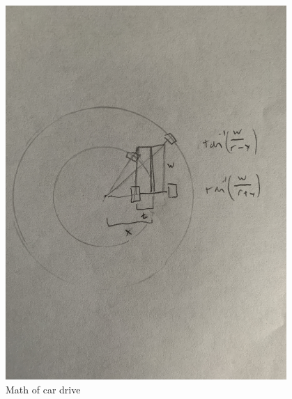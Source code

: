\begin{figure}[ht]
\begin{minipage}[b]{.48\textwidth}
  \includegraphics[width=0.95\textwidth]{Meetings/September/09-24-22/9-24-22_Hardware_Figure2.JPG}
  \caption{Math of car drive}
  \label{fig:pic2}
\end{minipage}
\end{figure}


